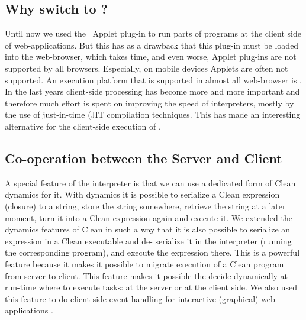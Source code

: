 \subsection{Why switch to \JS?}
Until now we used  the \Sapl\ \Java Applet plug-in to run parts of \Clean \Sapl programs at the client side of web-applications.
But this has as a drawback that this plug-in must be loaded into the web-browser, which 
takes time, and  even worse, \Java Applet plug-ins are not supported by all browsers.
Especially, on mobile devices \Java Applets are often not supported.
An execution platform that is supported in almost all web-browser is \JS.
In the last years client-side processing has become more and more important and therefore
much effort is spent on improving the speed of \JS interpreters,
mostly by the use of just-in-time (\textsf{JIT} compilation techniques.
This has made \JS an interesting alternative for the client-side execution of \Sapl.

\subsection{Co-operation between the Server and Client}
A special feature of the \Sapl interpreter is that we can use a dedicated form of \textsf{Clean} 
dynamics \cite{DYNAMICS} for it. With dynamics it is possible to serialize a \textsf{Clean} expression 
(closure) to a string, store the string somewhere, retrieve the string at a later moment, turn it into a 
\textsf{Clean} expression again and execute it. We extended the dynamics features of \textsf{Clean} in 
such a way that it is also possible to serialize an expression in a \textsf{Clean} executable and de-
serialize it in the \Sapl interpreter (running the corresponding \Sapl program), and execute the 
expression there. This is a powerful feature because it makes it possible to migrate execution of a 
\textsf{Clean} program from server to client.  
This feature makes it possible the decide dynamically at run-time where to execute tasks:
at the server or at the client side.
We also used this feature to do client-side event handling for interactive (graphical) web-applications 
\cite{iEditors}. 

